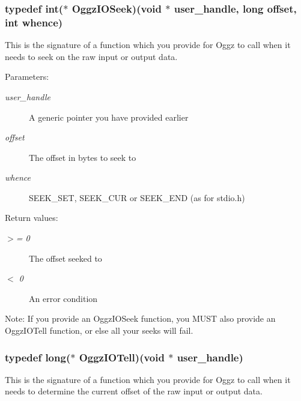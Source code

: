 \subsubsection{\setlength{\rightskip}{0pt plus 5cm}typedef int($\ast$ {\bf Oggz\-IOSeek})(void $\ast$ user\_\-handle, long offset, int whence)}\label{oggz__io_8h_a2}


This is the signature of a function which you provide for Oggz to call when it needs to seek on the raw input or output data. 

\begin{Desc}
\item[Parameters:]
\begin{description}
\item[{\em user\_\-handle}]A generic pointer you have provided earlier \item[{\em offset}]The offset in bytes to seek to \item[{\em whence}]SEEK\_\-SET, SEEK\_\-CUR or SEEK\_\-END (as for stdio.h) \end{description}
\end{Desc}
\begin{Desc}
\item[Return values:]
\begin{description}
\item[{\em $>$= 0}]The offset seeked to \item[{\em $<$  0}]An error condition\end{description}
\end{Desc}
\begin{Desc}
\item[Note:]If you provide an Oggz\-IOSeek function, you MUST also provide an Oggz\-IOTell function, or else all your seeks will fail. \end{Desc}
\subsubsection{\setlength{\rightskip}{0pt plus 5cm}typedef long($\ast$ {\bf Oggz\-IOTell})(void $\ast$ user\_\-handle)}\label{oggz__io_8h_a3}


This is the signature of a function which you provide for Oggz to call when it needs to determine the current offset of the raw input or output data. 

